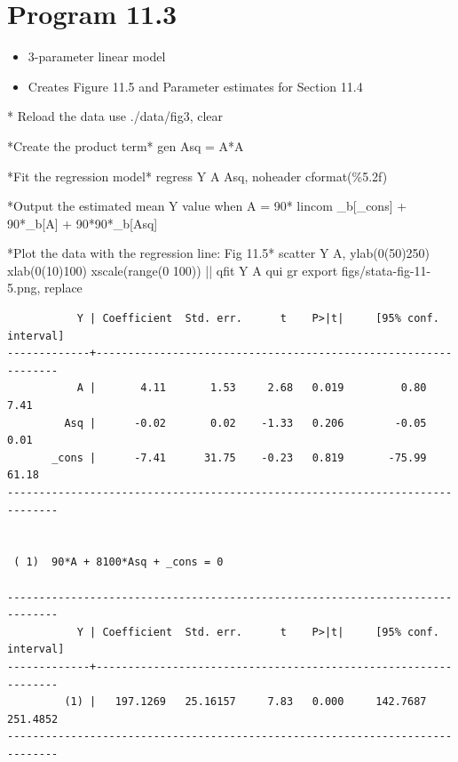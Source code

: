 \documentclass[
  10pt,
  a4paper,
]{book}
\newenvironment{Shaded}{\begin{snugshade}}{\end{snugshade}}
\newcommand{\BaseNTok}[1]{\textcolor[rgb]{0.68,0.00,0.00}{#1}}
\newcommand{\DataTypeTok}[1]{\textcolor[rgb]{0.68,0.00,0.00}{#1}}
\newcommand{\KeywordTok}[1]{\textcolor[rgb]{0.00,0.46,0.62}{#1}}
\newcommand{\NormalTok}[1]{\textcolor[rgb]{0.00,0.46,0.62}{#1}}
\newcommand{\OtherTok}[1]{\textcolor[rgb]{0.00,0.46,0.62}{#1}}
\providecommand{\tightlist}{%
  \setlength{\itemsep}{0pt}\setlength{\parskip}{0pt}}
\begin{document}
\section{Program 11.3}\label{program-11.3-1}

\begin{itemize}
\tightlist
\item
  3-parameter linear model
\item
  Creates Figure 11.5 and Parameter estimates for Section 11.4
\end{itemize}

\begin{Shaded}
\begin{Highlighting}[]
\NormalTok{* Reload the }\KeywordTok{data}
\KeywordTok{use}\NormalTok{ ./}\KeywordTok{data}\NormalTok{/fig3, }\KeywordTok{clear}

\NormalTok{*Create the product term*}
\KeywordTok{gen}\NormalTok{ Asq = A*A}

\NormalTok{*Fit the regression }\KeywordTok{model}\NormalTok{*}
\KeywordTok{regress}\NormalTok{ Y A Asq, }\KeywordTok{noheader}\NormalTok{ cformat(\%5.2f)}

\NormalTok{*Output the estimated }\KeywordTok{mean}\NormalTok{ Y }\OtherTok{value}\NormalTok{ when A = 90*}
\KeywordTok{lincom}\NormalTok{ \_b[}\DataTypeTok{\_cons}\NormalTok{] + 90*\_b[A] + 90*90*\_b[Asq]}

\NormalTok{*Plot the }\KeywordTok{data}\NormalTok{ with the regression }\KeywordTok{line}\NormalTok{: Fig 11.5*}
\KeywordTok{scatter}\NormalTok{ Y A, ylab(0(50)250) xlab(0(10)100) }\BaseNTok{xscale}\NormalTok{(}\KeywordTok{range}\NormalTok{(0 100)) || qfit Y A}
\KeywordTok{qui} \KeywordTok{gr} \KeywordTok{export}\NormalTok{ figs/stata{-}fig{-}11{-}5.png, }\KeywordTok{replace}
\end{Highlighting}
\end{Shaded}

\begin{verbatim}
           Y | Coefficient  Std. err.      t    P>|t|     [95% conf. interval]
-------------+----------------------------------------------------------------
           A |       4.11       1.53     2.68   0.019         0.80        7.41
         Asq |      -0.02       0.02    -1.33   0.206        -0.05        0.01
       _cons |      -7.41      31.75    -0.23   0.819       -75.99       61.18
------------------------------------------------------------------------------


 ( 1)  90*A + 8100*Asq + _cons = 0

------------------------------------------------------------------------------
           Y | Coefficient  Std. err.      t    P>|t|     [95% conf. interval]
-------------+----------------------------------------------------------------
         (1) |   197.1269   25.16157     7.83   0.000     142.7687    251.4852
------------------------------------------------------------------------------
\end{verbatim}
\end{document}
